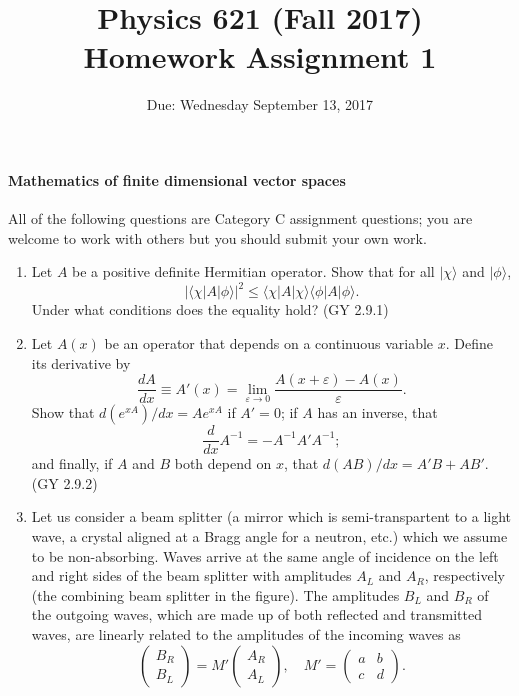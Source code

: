 \documentclass[letterpaper,11pt]{article}
\title{Physics 621 (Fall 2017) \\ Homework Assignment 1}
\date{Due: Wednesday September 13, 2017}
\begin{document}
\maketitle

\paragraph*{Mathematics of finite dimensional vector spaces}

All of the following questions are Category C assignment questions; you are welcome to work with others but you should submit your own work.

\begin{enumerate}
  \item Let $A$ be a positive definite Hermitian operator. Show that for all $|\chi\rangle$ and $|\phi\rangle$,
  $$ |\langle \chi|A|\phi \rangle|^2 \le \langle \chi|A|\chi \rangle \langle \phi|A|\phi \rangle. $$
  Under what conditions does the equality hold? (GY 2.9.1)
  \item Let $A(x)$ be an operator that depends on a continuous variable $x$. Define its derivative by
  $$ \frac{dA}{dx} \equiv A'(x) = \lim_{\varepsilon \to 0} \frac{A(x+\varepsilon)-A(x)}{\varepsilon}. $$
  Show that $d(e^{xA})/dx = Ae^{xA}$ if $A' = 0$; if $A$ has an inverse, that
  $$ \frac{d}{dx} A^{-1} = -A^{-1} A' A^{-1}; $$
  and finally, if $A$ and $B$ both depend on $x$, that $d(AB)/dx = A'B + AB'$. (GY 2.9.2)
  \item Let us consider a beam splitter (a mirror which is semi-transpartent to a light wave, a crystal aligned at a Bragg angle for a neutron, etc.) which we assume to be non-absorbing. Waves arrive at the same angle of incidence on the left and right sides of the beam splitter with amplitudes $A_L$ and $A_R$, respectively (the combining beam splitter in the figure). The amplitudes $B_L$ and $B_R$ of the outgoing waves, which are made up of both reflected and transmitted waves, are linearly related to the amplitudes of the incoming waves as
  $$ \left( \begin{array}{c} B_R \\ B_L \end{array} \right) = M' \left( \begin{array}{c} A_R \\ A_L \end{array} \right), \quad M' = \left( \begin{array}{cc} a & b \\ c & d  \end{array} \right). $$

\end{enumerate}
\end{document}
